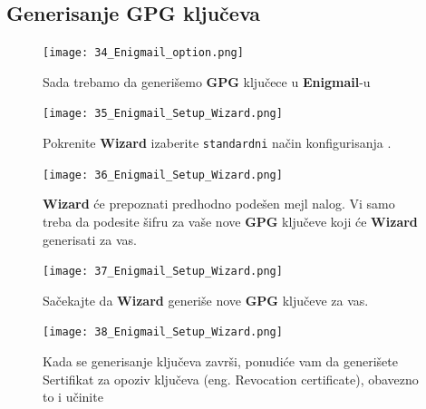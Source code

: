 \documentclass[a4paper,11pt]{article}
\begin{document}
\subsection{Generisanje GPG klju\v{c}eva}
\begin{figure}[!h]
	\begin{center}
		\texttt{[image: 34\_Enigmail\_option.png]}
		\caption{Sada trebamo da generi\v{s}emo \textbf{GPG} klju\v{c}ece u \textbf{Enigmail}-u}
		\label{enigmail_setup_wizard}
	\end{center}
\end{figure}

\begin{figure}[!h]
	\begin{center}
		\texttt{[image: 35\_Enigmail\_Setup\_Wizard.png]}
		\caption{Pokrenite \textbf{Wizard} izaberite \texttt{standardni} na\v{c}in konfigurisanja .}
		\label{enigmail_setup_wizard2}
	\end{center}
\end{figure}
\newpage
\begin{figure}[!h]
	\begin{center}
		\texttt{[image: 36\_Enigmail\_Setup\_Wizard.png]}
		\caption{\textbf{Wizard} \'{c}e prepoznati predhodno pode\v{s}en mejl nalog.
		\newline Vi samo treba da podesite \v{s}ifru za va\v{s}e nove \textbf{GPG} klju\v{c}eve koji \'{c}e \textbf{Wizard} generisati za vas.}
		\label{enigmail_setup_wizard3}
	\end{center}
\end{figure}

\begin{figure}[!h]
	\begin{center}
		\texttt{[image: 37\_Enigmail\_Setup\_Wizard.png]}
		\caption{Sa\v{c}ekajte da \textbf{Wizard} generi\v{s}e nove \textbf{GPG} klju\v{c}eve za vas.}
		\label{enigmail_setup_wizard4}
	\end{center}
\end{figure}
\newpage
\begin{figure}[!h]
	\begin{center}
		\texttt{[image: 38\_Enigmail\_Setup\_Wizard.png]}
		\caption{Kada se generisanje klju\v{c}eva zavr\v{s}i, ponudi\'{c}e vam da generi\v{s}ete \textsf{Sertifikat za opoziv klju\v{c}eva} (eng. Revocation certificate), obavezno to i u\v{c}inite}
		\label{enigmail_setup_wizard5}
	\end{center}
\end{figure}
\end{document}
